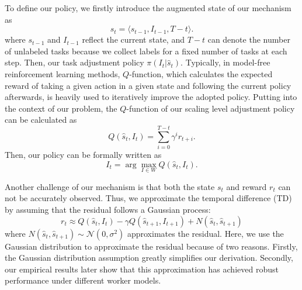 \documentclass[letterpaper]{article} %
\begin{document}
To define our policy, we firstly introduce the augmented state of our mechanism as 
\begin{equation}
\hat{s}_t=\langle s_{t-1}, I_{t-1}, T-t \rangle.
\end{equation}
where $s_{t-1}$ and $I_{t-1}$ reflect the current state, and $T-t$ can denote the number of unlabeled tasks because we collect labels for a fixed number of tasks at each step.
Then, our task adjustment policy $\pi(I_{t}|\hat{s}_t)$.
Typically, in model-free reinforcement learning methods, $Q$-function, which calculates the expected reward of taking a given action in a given state and following the current policy afterwards, is heavily used to iteratively improve the adopted policy.
Putting into the context of our problem, the $Q$-function of our scaling level adjustment policy can be calculated as
\begin{equation}
Q(\hat{s}_t, I_t)= {\sum}_{i=0}^{T-t} \gamma^{i} r_{t+i}.
\end{equation}
Then, our policy can be formally written as
\begin{equation}
I_t = \arg\max_{I\in W} Q(\hat{s}_t, I_t).
\end{equation}

Another challenge of our mechanism is that both the state $s_t$ and reward $r_t$ can not be accurately observed.
Thus, we approximate the temporal difference (TD) by assuming that the residual follows a Gaussian process:
\begin{equation}
r_t\approx Q(\hat{s}_t, I_t) - \gamma Q(\hat{s}_{t+1}, I_{t+1}) + N(\hat{s}_t,\hat{s}_{t+1})
\end{equation}
where $N(\hat{s}_t,\hat{s}_{t+1})\sim \mathcal{N}(0, \sigma^2)$ approximates the residual.
Here, we use the Gaussian distribution to approximate the residual because of two reasons.
Firstly, the Gaussian distribution assumption greatly simplifies our derivation.
Secondly, our empirical results later show that this approximation has achieved robust performance under different worker models.
\end{document}
